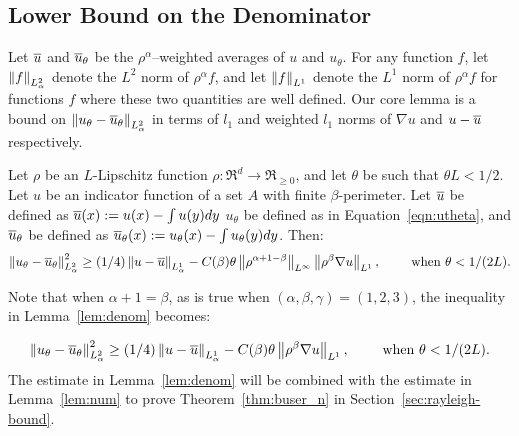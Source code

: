\subsection{Lower Bound on the Denominator}
Let ${\overline{u}}$ and
  ${\overline{u}}_\theta$ be the $\rho^\alpha$--weighted averages of $u$ and
  $u_\theta$. For any function $f$, let $\left\lVert f \right\rVert_{L^2_\alpha}$ denote the $L^2$ norm of $\rho^\alpha
  f$, and let $\left\lVert f \right\rVert_{L^1}$ denote the $L^1$ norm of $\rho^\alpha f$ for
  functions $f$ where these two quantities are well defined.
  Our core lemma is a bound on $\left\lVert u_\theta-{\overline{u}}_\theta \right\rVert_{L^2_\alpha}$ in
  terms of $l_1$ and weighted $l_1$ norms of $\nabla u$ and $u -
  {\overline{u}}$ respectively.
  \begin{lemma}\label{lem:denom}
  Let $\rho$ be an $L$-Lipschitz function $\rho: \Re^d \to
  \Re_{\geq 0}$, and let $\theta$ be such
  that $\theta L < 1/2$.
  Let $u$ be an indicator function of a set $A$ with finite
  $\beta$-perimeter. Let ${\overline{u}}$ be defined as ${\overline{u}}(x):=u(x) - \int u(y) dy$
    $u_\theta$ be defined as in Equation~\ref{eqn:utheta}, and
    ${\overline{u}}_\theta$ be defined as ${\overline{u}}_\theta(x) := u_\theta(x)
    - \int
    u_\theta(y) dy$.
    Then:
  \begin{align}
  \left\lVert u_\theta - {\overline{u}}_\theta \right\rVert_{L^2_\alpha}^2
  \geq (1/4) \left\lVert u-{\overline{u}} \right\rVert_{L^1_\alpha} 
  - C(\beta) \theta \left\lVert \rho^{\alpha+1-\beta} \right\rVert_{{L^\infty}} \left\lVert \rho^\beta \nabla u \right\rVert_{L^1},
  \qquad \text{ when } \theta < 1 / (2L).
  \end{align}
  \end{lemma}

  Note that when $\alpha + 1 = \beta$, as is true when $(\alpha,
      \beta, \gamma) = (1,2,3)$, the inequality in
  Lemma~\ref{lem:denom} becomes:

  \[
  \left\lVert u_\theta - {\overline{u}}_\theta \right\rVert_{L^2_\alpha}^2
  \geq (1/4) \left\lVert u-{\overline{u}} \right\rVert_{L^1_\alpha} 
  - C(\beta) \theta \left\lVert \rho^\beta \nabla u \right\rVert_{L^1},
  \qquad \text{ when } \theta < 1 / (2L).
  \]
  The estimate in Lemma~\ref{lem:denom} will be combined with the
  estimate in Lemma~\ref{lem:num} to prove
  Theorem~\ref{thm:buser_n}
  in Section~\ref{sec:rayleigh-bound}.


